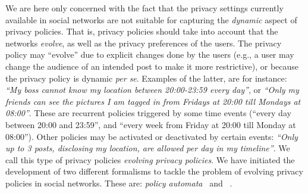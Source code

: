 
We are here only concerned with the fact that the privacy settings currently available in social networks are not suitable for capturing the {\em dynamic} aspect of privacy policies. That is, privacy policies should take into account that the networks {\it evolve}, as well as the privacy preferences of the users. The privacy policy may ``evolve'' due to explicit changes done by the users (e.g., a user may change the audience of an intended post to make it more restrictive), or because the privacy policy is dynamic {\it per se}. Examples of the latter, are for instance: {\it ``My boss cannot know my location between 20:00-23:59 every day''}, or {\it ``Only my friends can see the pictures I am tagged in from Fridays at 20:00 till Mondays at 08:00''}. These are recurrent policies triggered by some time events (``every day between 20:00 and 23:59'', and ``every week from Friday at 20:00 till Monday at 08:00''). Other policies may be activated or deactivated by certain events: {\it ``Only up to 3 posts, disclosing my location, are allowed per day in my timeline''}. We call this type of privacy policies {\em evolving privacy policies}. We have initiated the development of two different formalisms to tackle the problem of evolving privacy policies in social networks. These are: {\em policy automata}~\cite{PCPS16aaeppsn} and \tfppf~\cite{PKSS16sepposn}.

